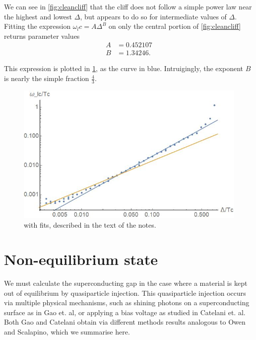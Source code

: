 \documentclass[%
 preprint,
 amsmath,amssymb,
 aps,
]{revtex4-2}
\begin{document}
We can see in \cref{fig:cleancliff} that the cliff does not follow a simple power law near the highest and lowest $\Delta$, but appears to do so for intermediate values of $\Delta$.
Fitting the expression $\omega_lc = A \Delta^B$ on only the central portion of \cref{fig:cleancliff} returns parameter values
\begin{align} %
	A &= 0.452107 \\
	B &= 1.34246.
\end{align}

This expression is plotted in \cref{fig:fittedcliff}, as the curve in blue.
Intruigingly, the exponent $B$ is nearly the simple fraction $\frac{4}{3}$.

\begin{figure}[htp]
	\centering
	\includegraphics[width=\linewidth]{fittedcliff}
	\caption{ with fits, described in the text of the notes.} \label{fig:fittedcliff}
\end{figure}


\section{Non-equilibrium state} \label{sec:nonequilibrium}
We must calculate the superconducting gap in the case where a material is kept out of equilibrium by quasiparticle injection.
This quasiparticle injection occurs via multiple physical mechanisms, such as shining photons on a superconducting surface as in Gao et. al\cite{Gao2008}, or applying a bias voltage as studied in Catelani et. al\cite{Catelani2010}.
Both Gao and Catelani obtain via different methods results analogous to Owen and Scalapino\cite{OwenScalapino}, which we summarise here.
\end{document}
